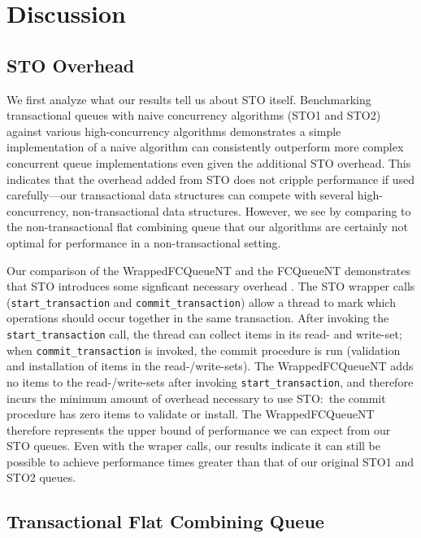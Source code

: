 \section{Discussion}

\subsection{STO Overhead}
We first analyze what our results tell us about STO itself. Benchmarking transactional queues with naive concurrency algorithms (STO1 and STO2) against various high-concurrency algorithms demonstrates a simple implementation of a naive algorithm can consistently outperform more complex concurrent queue implementations even given the additional STO overhead. This indicates that the overhead added from STO does not cripple performance if used carefully---our transactional data structures can compete with several high-concurrency, non-transactional data structures. However, we see by comparing to the non-transactional flat combining queue that our algorithms are certainly not optimal for performance in a non-transactional setting.

Our comparison of the WrappedFCQueueNT and the FCQueueNT demonstrates that STO introduces some signficant necessary overhead . The STO wrapper calls (\texttt{start\_transaction} and \texttt{commit\_transaction}) allow a thread to mark which operations should occur together in the same transaction. After invoking the \texttt{start\_transaction} call, the thread can collect items in its read- and write-set; when \texttt{commit\_transaction} is invoked, the commit procedure is run (validation and installation of items in the read-/write-sets). The WrappedFCQueueNT adds no items to the read-/write-sets after invoking \texttt{start\_transaction}, and therefore incurs the minimum amount of overhead necessary to use STO:\ the commit procedure has zero items to validate or install. The WrappedFCQueueNT therefore represents the upper bound of performance we can expect from our STO queues. Even with the wraper calls, our results indicate it can still be possible to achieve performance  times greater than that of our original STO1 and STO2 queues.

\subsection{Transactional Flat Combining Queue}

